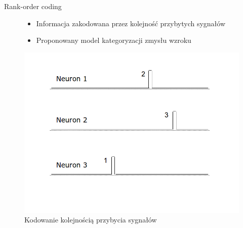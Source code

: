 \documentclass{beamer}
\begin{document}
\begin{frame}{Rank-order coding}
	\begin{figure}[ht]
		\begin{minipage}{0.48\linewidth}
			\begin{itemize}
				\item Informacja zakodowana przez kolejność przybytych sygnałów
				\item Proponowany model kategoryzacji zmysłu wzroku
			\end{itemize}
		\end{minipage}
		\hfill
		\begin{minipage}{0.48\linewidth}
		\centering
		\includegraphics[width=\textwidth]{ROC.png}
		\caption{Kodowanie kolejnością przybycia sygnałów}
		\end{minipage}
	\end{figure}
\end{frame}
\end{document}
